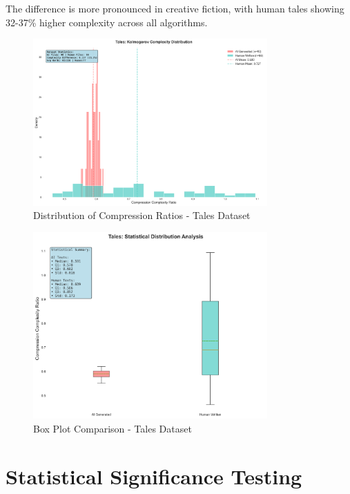 \documentclass[12pt,a4paper]{report}
\begin{document}
The difference is more pronounced in creative fiction, with human tales showing 32-37\% higher complexity across all algorithms.

\begin{figure}[h]
\centering
\includegraphics[width=0.8\textwidth]{figures/tales_visualizations/01_distribution_comparison.png}
\caption{Distribution of Compression Ratios - Tales Dataset}
\label{fig:tales_distribution}
\end{figure}

\begin{figure}[h]
\centering
\includegraphics[width=0.8\textwidth]{figures/tales_visualizations/02_box_plot_comparison.png}
\caption{Box Plot Comparison - Tales Dataset}
\label{fig:tales_boxplot}
\end{figure}

\section{Statistical Significance Testing}
\end{document}
